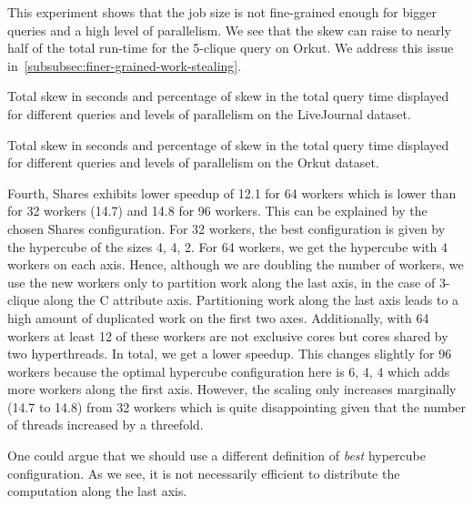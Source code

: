 This experiment shows that the job size is not fine-grained enough for bigger queries and a high level of parallelism.
We see that the skew can raise to nearly half of the total run-time for the 5-clique query
on Orkut.
We address this issue in~\cref{subsubsec:finer-grained-work-stealing}.

\begin{table}
    \centering
    
    \caption{
    Total skew in seconds and percentage of skew in the total query time displayed for different
    queries and levels of parallelism on the LiveJournal dataset.
    }\label{table:skew-liveJ}
\end{table}

\begin{table}
    \centering
    
    \caption{
    Total skew in seconds and percentage of skew in the total query time displayed for different
    queries and levels of parallelism on the Orkut dataset.
    }\label{table:skew-orkut}
\end{table}

Fourth, Shares exhibits lower speedup of 12.1 for 64 workers which is
lower than for 32 workers (14.7) and 14.8 for 96 workers.
This can be explained by the chosen Shares configuration.
For 32 workers, the best configuration is given by the hypercube of the sizes 4, 4, 2.
For 64 workers, we get the hypercube with 4 workers on each axis.
Hence, although we are doubling the number of workers, we use the new workers only to partition
work along the last axis, in the case of 3-clique along the C attribute axis.
Partitioning work along the last axis leads to a high amount of duplicated work on the first
two axes.
Additionally, with 64 workers at least 12 of these workers are not exclusive cores but cores shared by
two hyperthreads.
In total, we get a lower speedup.
This changes slightly for 96 workers because the optimal hypercube configuration here is 6, 4, 4 which
adds more workers along the first axis.
However, the scaling only increases marginally (14.7 to 14.8) from 32 workers which is quite disappointing given
that the number of threads increased by a threefold.

One could argue that we should use a different definition of \textit{best} hypercube configuration.
As we see, it is not necessarily efficient to distribute the computation along the last axis.

